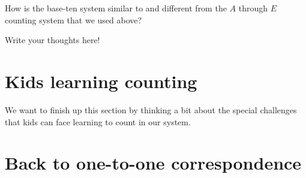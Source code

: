 \documentclass{ximera}
\begin{document}
\begin{question}
How is the base-ten system similar to and different from the $A$ through $E$ counting system that we used above?

\begin{freeResponse}
Write your thoughts here!
\end{freeResponse}
\end{question}

\section{Kids learning counting}

We want to finish up this section by thinking a bit about the special challenges that kids can face learning to count in our system.



\section{Back to one-to-one correspondence}
\end{document}

